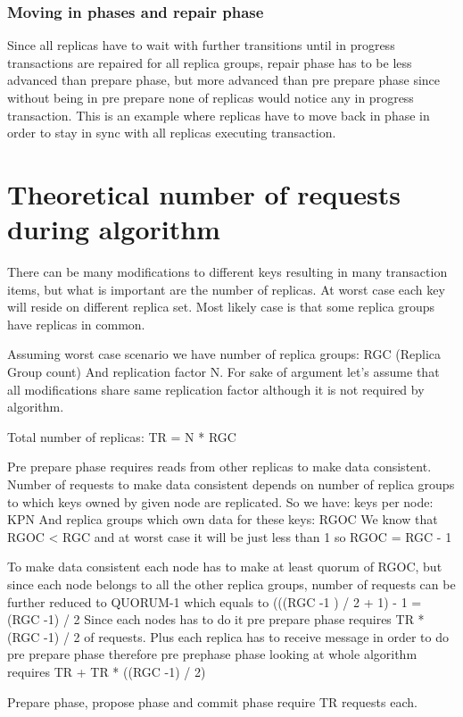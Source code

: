 \subsubsection{Moving in phases and repair phase}
Since all replicas have to wait with further transitions until in progress transactions are repaired for all replica groups, repair phase has to be less advanced than prepare phase, but more advanced than pre prepare phase since without being in pre prepare none of replicas would notice any in progress transaction. This is an example where replicas have to move back in phase in order to stay in sync with all replicas executing transaction.




\section{Theoretical number of requests during algorithm}
There can be many modifications to different keys resulting in many transaction items, but what is important are the number of replicas. At worst case each key will reside on different replica set. Most likely case is that some replica groups have replicas in common.


Assuming worst case scenario we have number of replica groups: RGC (Replica Group count)
And replication factor N. For sake of argument let’s assume that all modifications share same replication factor although it is not required by algorithm.


Total number of replicas: TR = N * RGC


Pre prepare phase requires reads from other replicas to make data consistent. Number of requests to make data consistent depends on number of replica groups to which keys owned by given node are replicated. So we have:
keys per node: KPN
And replica groups which own data for these keys: RGOC
We know that RGOC < RGC and at worst case it will be just less than 1 so RGOC = RGC - 1


To make data consistent each node has to make at least quorum of RGOC, but since each node belongs to all the other replica groups, number of requests can be further reduced to QUORUM-1 which equals to (((RGC -1 ) / 2 + 1) - 1 = (RGC -1) / 2
Since each nodes has to do it pre prepare phase requires TR * (RGC -1) / 2 of requests. Plus each replica has to receive message in order to do pre prepare phase therefore pre prephase phase looking at whole algorithm requires TR + TR * ((RGC -1) / 2) 


Prepare phase, propose phase and commit phase require TR requests each.


